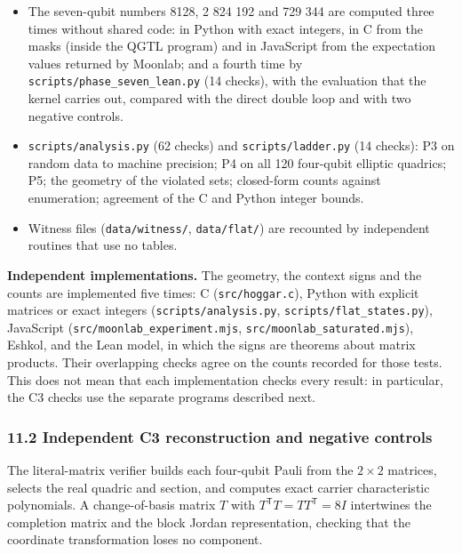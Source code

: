 \documentclass[11pt,a4paper]{article}
\begin{document}
\begin{itemize}
  Theorem 13, the orbit computation, and the random census of the other types; its output is
  \nolinkurl{results/family7.log}. The two counts agree: 13 271 040 solutions found, and
  \(92\,897\,280/7 = 13\,271\,040\) for one orbit with a stabilizer of order 7.
\item
  The seven-qubit numbers 8128, 2 824 192 and 729 344 are computed three times without shared code: in
  Python with exact integers, in C from the masks (inside the QGTL program) and in JavaScript from the
  expectation values returned by Moonlab; and a fourth time by \nolinkurl{scripts/phase_seven_lean.py} (14
  checks), with the evaluation that the kernel carries out, compared with the direct double loop and
  with two negative controls.
\item
  \nolinkurl{scripts/analysis.py} (62 checks) and \texttt{scripts/ladder.py} (14 checks): P3 on random data to machine
  precision; P4 on all 120 four-qubit elliptic quadrics; P5; the geometry of the violated sets; closed-form
  counts against enumeration; agreement of the C and Python integer bounds.
\item
  Witness files (\texttt{data/witness/}, \texttt{data/flat/}) are recounted by independent routines that use no tables.
\end{itemize}

\textbf{Independent implementations.} The geometry, the context signs and the counts are implemented five
times: C (\texttt{src/hoggar.c}), Python with explicit matrices or exact integers (\nolinkurl{scripts/analysis.py},
\nolinkurl{scripts/flat_states.py}), JavaScript (\nolinkurl{src/moonlab_experiment.mjs}, \nolinkurl{src/moonlab_saturated.mjs}),
Eshkol, and the Lean model, in which the signs are theorems about matrix products. Their overlapping
checks agree on the counts recorded for those tests. This does not mean that each implementation
checks every result: in particular, the C3 checks use the separate programs described next.

\subsubsection{11.2 Independent C3 reconstruction and negative controls}\label{112-independent-c3-reconstruction-and-negative-controls}

The literal-matrix verifier builds each four-qubit Pauli from the \(2\times2\) matrices, selects the
real quadric and section, and computes exact carrier characteristic polynomials. A change-of-basis
matrix \(T\) with \(T^{\mathsf T}T=TT^{\mathsf T}=8I\) intertwines the completion matrix and the block
Jordan representation, checking that the coordinate transformation loses no component.
\end{document}
